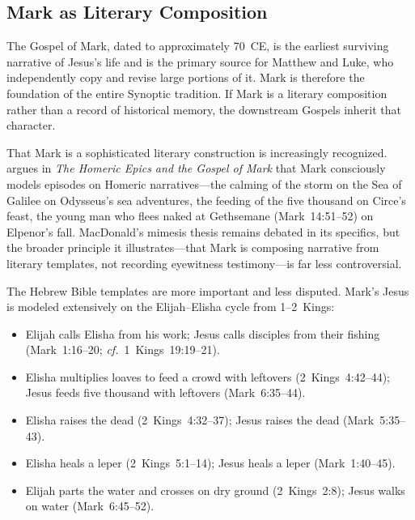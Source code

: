 \documentclass[12pt,oneside]{article}
\newcommand{\cf}{\textit{cf.}}
\begin{document}
\subsection{Mark as Literary Composition}
\label{sec:gospels:mark}

The Gospel of Mark, dated to approximately 70~CE, is the earliest
surviving narrative of Jesus's life and is the primary source for
Matthew and Luke, who independently copy and revise large portions of
it.  Mark is therefore the foundation of the entire Synoptic tradition.
If Mark is a literary composition rather than a record of historical
memory, the downstream Gospels inherit that character.

That Mark is a sophisticated literary construction is increasingly
recognized.  \citet{MacDonald2000} argues in \textit{The Homeric Epics
and the Gospel of Mark} that Mark consciously models episodes on Homeric
narratives---the calming of the storm on the Sea of Galilee on
Odysseus's sea adventures, the feeding of the five thousand on
Circe's feast, the young man who flees naked at Gethsemane
(Mark~14:51--52) on Elpenor's fall.  MacDonald's mimesis thesis remains
debated in its specifics, but the broader principle it
illustrates---that Mark is composing narrative from literary templates,
not recording eyewitness testimony---is far less controversial.

The Hebrew Bible templates are more important and less disputed.  Mark's
Jesus is modeled extensively on the Elijah--Elisha cycle from 1--2~Kings:

\begin{itemize}[leftmargin=2em]
\item Elijah calls Elisha from his work; Jesus calls disciples from
their fishing (Mark~1:16--20; \cf\ 1~Kings~19:19--21).
\item Elisha multiplies loaves to feed a crowd with leftovers
(2~Kings~4:42--44); Jesus feeds five thousand with leftovers
(Mark~6:35--44).
\item Elisha raises the dead (2~Kings~4:32--37); Jesus raises the dead
(Mark~5:35--43).
\item Elisha heals a leper (2~Kings~5:1--14); Jesus heals a leper
(Mark~1:40--45).
\item Elijah parts the water and crosses on dry ground
(2~Kings~2:8); Jesus walks on water (Mark~6:45--52).
\end{itemize}
\end{document}
